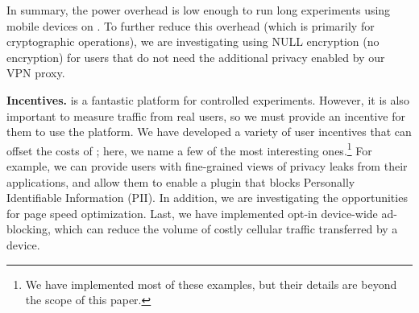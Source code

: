 \begin{itemize}
In summary, the power overhead is low enough to run long experiments
using mobile devices on \platname. To further reduce this overhead (which is primarily for
cryptographic operations), we are investigating using NULL encryption
(\ie no encryption) for users that do not need the additional privacy
enabled by our VPN proxy.

\end{itemize}

\noindent\textbf{Incentives.} \platname{} is a fantastic platform for
controlled experiments. However, it is also important to measure
traffic from real users, so we must provide an incentive for them to
use the platform. We have developed a variety of user incentives that
can offset the costs of \platname{}; here, we name a few of the most
interesting ones.\footnote{We have implemented most of these examples,
  but their details are beyond the scope of this paper.} For example,
we can provide users with fine-grained views of privacy leaks from
their applications, and allow them to enable a \platname{} plugin that
blocks Personally Identifiable Information (PII). In addition, we are
investigating the opportunities for page speed optimization. Last, we
have implemented opt-in device-wide ad-blocking, which can reduce the
volume of costly cellular traffic transferred by a device.


